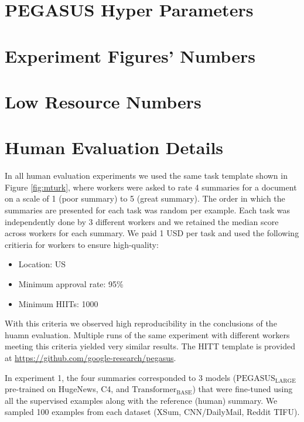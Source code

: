 \documentclass{article}
\newcommand\transformerbase{$\text{Transformer}_{\text{BASE}}$\xspace}
\newcommand\pegasuslarge{$\text{PEGASUS}_{\text{LARGE}}$\xspace}
\newcommand\gnews{HugeNews\xspace}
\newcommand\pegasuscode{\url{https://github.com/google-research/pegasus}}
\begin{document}
\clearpage
\section{PEGASUS Hyper Parameters}
\label{appendix:hparams}


\clearpage
\section{Experiment Figures' Numbers}
\label{appendix:exps}


\clearpage
\section{Low Resource Numbers}
\label{appendix:low_resource}


\clearpage
\section{Human Evaluation Details}
\label{appendix:human}

In all human evaluation experiments we used the same task template
shown in Figure \ref{fig:mturk}, where workers were asked to rate
4 summaries for a document on a scale of 1 (poor summary) to 5 (great summary). The order in which the summaries are presented for each task was random per example. Each task was independently done by 3 different workers and we retained the median score across workers for each summary. We paid 1 USD per task and used the following critieria for
workers to ensure high-quality:
\begin{itemize}
    \item Location: US
    \item Minimum approval rate: 95\%
    \item Minimum HIITs: 1000
\end{itemize}

With this criteria we observed high reproducibility in the conclusions of the huamn evaluation. Multiple runs of the same experiment with different workers meeting this criteria yielded very similar results. The HITT template is provided at \pegasuscode.

In experiment 1, the four summaries corresponded to 3 models (\pegasuslarge pre-trained on \gnews, C4, and \transformerbase) that were fine-tuned using all the supervised examples along with the reference (human) summary. We sampled 100 examples from each dataset (XSum, CNN/DailyMail, Reddit TIFU).
\end{document}
